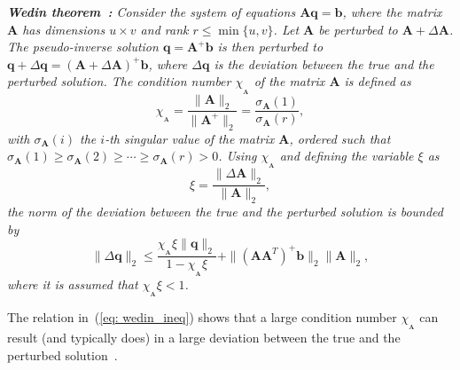 \documentclass[twocolumn]{bmcart}%
\begin{document}
{\textit{\textbf{Wedin theorem~\cite{Wedin_1973}:} \enspace
Consider the system of equations $\mathbf{A}\mathbf{q} = \mathbf{b}$, where the matrix $\mathbf{A}$ has dimensions $u \times v$ and rank $r \leq \min\{u,v\}$. 
Let $\mathbf{A}$ be perturbed to $\mathbf{A} + \Delta{\mathbf{A}}$.
The pseudo-inverse solution $\mathbf{q} = \mathbf{A}^+\mathbf{b}$ is then perturbed to $\mathbf{q} + \Delta\mathbf{q} = (\mathbf{A} + \Delta{\mathbf{A}})^+\mathbf{b}$, where $\Delta\mathbf{q}$ is the deviation between the true and the perturbed solution.
The condition number $\chi_{_{\mathbf{A}}}$ of the matrix $\mathbf{A}$ is defined as
\begin{equation}
\label{eq: cond_def}
\chi_{_{\mathbf{A}}} = \frac{\|\mathbf{A}\|_2}{\|\mathbf{A}^+\|_2} = \frac{\sigma_{\mathbf{A}}(1)}{\sigma_{\mathbf{A}}(r)},
\end{equation}
with $\sigma_{\mathbf{A}}(i)$ the $i$-th singular value of the matrix $\mathbf{A}$, ordered such that $\sigma_{\mathbf{A}}(1) \geq \sigma_{\mathbf{A}}(2) \geq \cdots \geq \sigma_{\mathbf{A}}(r) > 0$.
Using $\chi_{_{\mathbf{A}}}$ and defining the variable $\xi$ as
\begin{equation}
  \xi = \frac{\|\Delta \mathbf{A}\|_2}{\| \mathbf{A}\|_2},
\end{equation}
the norm of the deviation between the true and the perturbed solution is bounded by
\begin{equation}
\label{eq: wedin_ineq}
\|\Delta\mathbf{q} \|_2 \leq \frac{\chi_{_{\mathbf{A}}} \xi \| \mathbf{q} \|_2}{1 - \chi_{_{\mathbf{A}}} \xi} + \|(\mathbf{A}\mathbf{A}^T)^+\mathbf{b} \|_2 \|\mathbf{A} \|_2,
\end{equation}
where it is assumed that $\chi_{_{\mathbf{A}}} \xi < 1$.
}}

The relation in~(\ref{eq: wedin_ineq}) shows that a large condition number $\chi_{_{\mathbf{A}}}$ can result (and typically does) in a large deviation between the true and the perturbed solution~\cite{Wedin_1973,Golub_Matrix_book}.
\end{document}
